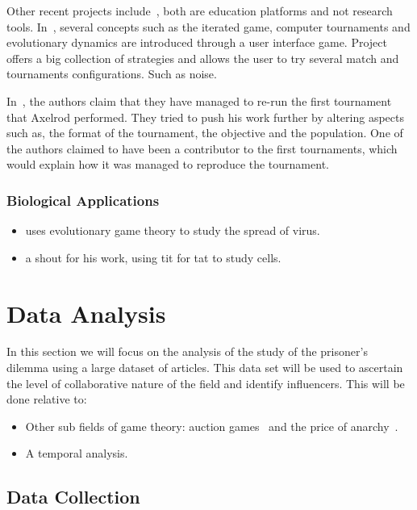 \documentclass{article}
\theoremstyle{definition}
\begin{document}
Other recent projects include~\cite{pd_trust, pd_game}, both are education
platforms and not research tools. In~\cite{pd_trust}, several concepts such as
the iterated game, computer tournaments and evolutionary dynamics are introduced
through a user interface game. Project~\cite{pd_game} offers a big collection of
strategies and allows the user to try several match and tournaments configurations.
Such as noise.

In~\cite{Rapoport2015}, the authors claim that they have managed to
re-run the first tournament that Axelrod performed. They tried to push his work
further by altering aspects such as, the format of the tournament, the objective
and the population. One of the authors claimed to have been a contributor
to the first tournaments, which would explain how it was managed to reproduce
the tournament.

\subsubsection{Biological Applications}
\begin{itemize}
    \item \cite{Turner1999} uses evolutionary game theory to study the spread of
    virus.
    \item \cite{Douglas2011} a shout for his work, using tit for tat to study cells.
\end{itemize}

\section{Data Analysis}\label{section:analysis}

In this section we will focus on the analysis of the study of the prisoner's dilemma
using a large dataset of articles. This data set will be used to ascertain the level
of collaborative nature of the field and identify influencers. This will be done
relative to:

\begin{itemize}
    \item Other sub fields of game theory: auction games~\cite{menezes2005} and 
    the price of anarchy~\cite{roughgarden2005}.
    \item A temporal analysis.
\end{itemize}

\subsection{Data Collection}
\end{document}
